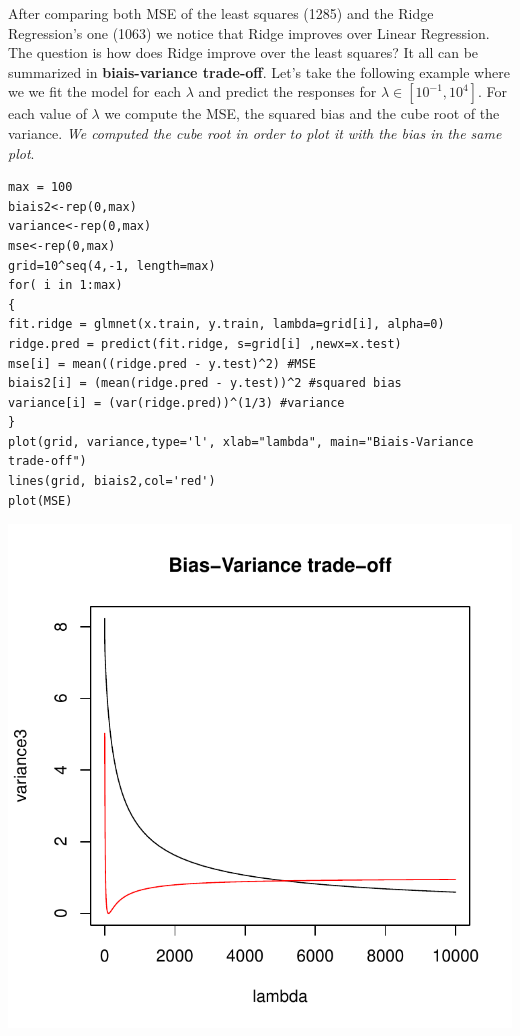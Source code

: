 \documentclass[]{report}
\begin{document}
After comparing both MSE of the least squares (1285) and the Ridge Regression's one (1063) we notice that Ridge improves over Linear Regression. 
The question is how does Ridge improve over the least squares? It all can be summarized in\textbf{ biais-variance trade-off}. Let's take the following example where we we fit the model for each $\lambda$ and predict the responses for $\lambda\in[10^{-1},10^{4}]$. For each value of $\lambda$ we compute the MSE, the squared bias and the cube root of the variance. \textit{We computed the cube root in order to plot it with the bias in the same plot}.
\begin{lstlisting}
max = 100
biais2<-rep(0,max)
variance<-rep(0,max) 
mse<-rep(0,max)
grid=10^seq(4,-1, length=max)
for( i in 1:max)
{     
fit.ridge = glmnet(x.train, y.train, lambda=grid[i], alpha=0)
ridge.pred = predict(fit.ridge, s=grid[i] ,newx=x.test)
mse[i] = mean((ridge.pred - y.test)^2) #MSE
biais2[i] = (mean(ridge.pred - y.test))^2 #squared bias
variance[i] = (var(ridge.pred))^(1/3) #variance
}
plot(grid, variance,type='l', xlab="lambda", main="Biais-Variance trade-off")
lines(grid, biais2,col='red')
plot(MSE)
\end{lstlisting}

\begin{center}
	\includegraphics[width=0.8\linewidth]{Figures/ridge_bias_var.pdf}
\end{center}
\end{document}
